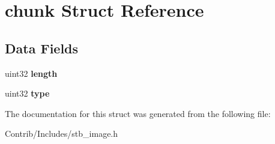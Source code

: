 \hypertarget{structchunk}{}\section{chunk Struct Reference}
\label{structchunk}
\subsection*{Data Fields}
\begin{DoxyCompactItemize}
\item 
uint32 {\bfseries length}\hypertarget{structchunk_ae4f719e9aed394c364b0e8c7dbb2e67a}{}\label{structchunk_ae4f719e9aed394c364b0e8c7dbb2e67a}

\item 
uint32 {\bfseries type}\hypertarget{structchunk_af356674bbaaf9bb782af79059eef1346}{}\label{structchunk_af356674bbaaf9bb782af79059eef1346}

\end{DoxyCompactItemize}


The documentation for this struct was generated from the following file\+:\begin{DoxyCompactItemize}
\item 
Contrib/\+Includes/stb\+\_\+image.\+h\end{DoxyCompactItemize}
